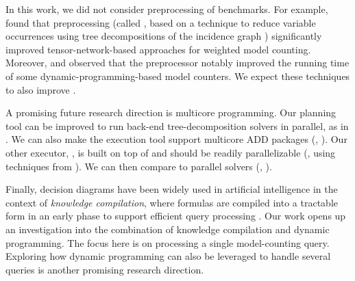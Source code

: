 In this work, we did not consider preprocessing of benchmarks.
For example, \cite{dudek2019efficient} found that preprocessing (called , based on a technique to reduce variable occurrences using tree decompositions of the incidence graph \cite{samer2010constraint}) significantly improved tensor-network-based approaches for weighted model counting.
Moreover, \cite{fichte2019improved} and \cite{dudek2020parallel} observed that the  preprocessor \cite{lagniez2014preprocessing} notably improved the running time of some dynamic-programming-based model counters.
We expect these techniques to also improve .

A promising future research direction is multicore programming.
Our planning tool \Lg{} can be improved to run back-end tree-decomposition solvers in parallel, as in \cite{dudek2020parallel}.
We can also make the execution tool \Dmc{} support multicore ADD packages (\eg, \sylvan{} \cite{van2015sylvan}).
Our other executor, \Tensor{}, is built on top of \Numpy{} \cite{numpy} and should be readily parallelizable (\eg, using techniques from \cite{dudek2020parallel}).
We can then compare \Dpmc{} to parallel solvers (\eg, \cite{dal2018parallel,burchard2015laissez}).

Finally, decision diagrams have been widely used in artificial intelligence in the context of \emph{knowledge compilation}, where formulas are compiled into a tractable form in an early phase to support efficient query processing \cite{koriche2013knowledge,lagniez2017improved,darwiche2004new,oztok2015top}.
Our work opens up an investigation into the combination of knowledge compilation and dynamic programming.
The focus here is on processing a single model-counting query.
Exploring how dynamic programming can also be leveraged to handle several queries is another promising research direction.
